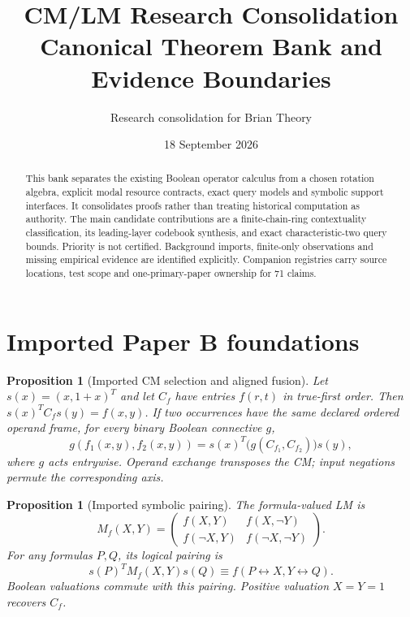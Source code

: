 \documentclass[11pt]{article}
\title{CM/LM Research Consolidation\\Canonical Theorem Bank and Evidence Boundaries}
\author{Research consolidation for Brian Theory}
\date{18 September 2026}
\newtheorem{proposition}[theorem]{Proposition}
\theoremstyle{remark}
\begin{document}
\maketitle
\begin{abstract}
This bank separates the existing Boolean operator calculus from a chosen
rotation algebra, explicit modal resource contracts, exact query models and
symbolic support interfaces. It consolidates proofs rather than treating
historical computation as authority. The main candidate contributions are a
finite-chain-ring contextuality classification, its leading-layer codebook
synthesis, and exact characteristic-two query bounds. Priority is not certified.
Background imports, finite-only observations and missing empirical evidence are
identified explicitly. Companion registries carry source locations, test scope
and one-primary-paper ownership for 71 claims.
\end{abstract}
\tableofcontents
\newpage



\section{Imported Paper B foundations}
\label{sec:paperb}
\begin{proposition}[Imported CM selection and aligned fusion]
Let $s(x)=(x,1+x)^T$ and let $C_f$ have entries $f(r,t)$ in true-first order.
Then $s(x)^T C_f s(y)=f(x,y)$. If two occurrences have the same declared
ordered operand frame, for every binary Boolean connective $g$,
\[
 g(f_1(x,y),f_2(x,y))=s(x)^T\bigl(g(C_{f_1},C_{f_2})\bigr)s(y),
\]
where $g$ acts entrywise. Operand exchange transposes the CM; input negations
permute the corresponding axis.
\end{proposition}

\begin{proposition}[Imported symbolic pairing]
The formula-valued LM is
\[
 M_f(X,Y)=\begin{pmatrix}f(X,Y)&f(X,\neg Y)\\
 f(\neg X,Y)&f(\neg X,\neg Y)\end{pmatrix}.
\]
For any formulas $P,Q$, its logical pairing is
\[
 s(P)^T M_f(X,Y)s(Q)\equiv f(P\leftrightarrow X,Y\leftrightarrow Q).
\]
Boolean valuations commute with this pairing. Positive valuation $X=Y=1$
recovers $C_f$.
\end{proposition}
\end{document}
